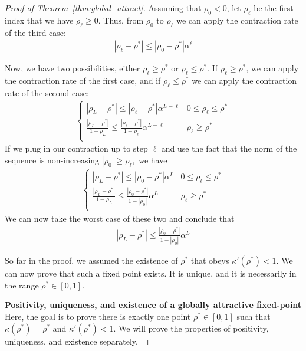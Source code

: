 \documentclass[twoside]{article}
\theoremstyle{definition}
\begin{document}
\begin{proof}[Proof of Theorem~\ref{thm:global_attract}]
Assuming that $\rho_0 < 0$, let $\rho_\ell$ be the first index that we have $\rho_\ell \ge 0$. Thus, from $\rho_0$ to $\rho_\ell$ we can apply the contraction rate of the third case:
\begin{align*}
|\rho_\ell - \rho^*| \le |\rho_0 - \rho^*| \alpha^\ell
\end{align*}

Now, we have two possibilities, either $\rho_\ell \ge \rho^*$ or $\rho_\ell \le \rho^*$. If $\rho_\ell \ge \rho^*$, we can apply the contraction rate of the first case, and if $\rho_\ell \le \rho^*$ we can apply the contraction rate of the second case:
\begin{align*}
    \begin{cases}
|\rho_L - \rho^*| \le |\rho_\ell - \rho^*| \alpha^{L-\ell} & 0\le \rho_\ell\le \rho^*\\
\frac{|\rho_L-\rho^*|}{1-\rho_L} \le \frac{|\rho_\ell-\rho^*|}{1-\rho_\ell}\alpha^{L-\ell} & \rho_\ell\ge \rho^* \\
    \end{cases}
\end{align*}
If we plug in our contraction up to step $\ell$ and use the fact that the norm of the sequence is non-increasing $|\rho_0|\ge \rho_\ell,$ we have
\begin{align*}
    \begin{cases}
|\rho_L - \rho^*| \le |\rho_0 - \rho^*| \alpha^{L} & 0\le \rho_\ell\le \rho^*\\
\frac{|\rho_L-\rho^*|}{1-\rho_L} \le \frac{|\rho_0-\rho^*|}{1-|\rho_0|}\alpha^{L} & \rho_\ell\ge \rho^* \\
    \end{cases}
\end{align*}
We can now take the worst case of these two and conclude that
\begin{align*}
|\rho_L - \rho^*| \le \frac{|\rho_0 - \rho^*|}{1-|\rho_0|} \alpha^L
\end{align*}

So far in the proof, we assumed the existence of $\rho^*$ that obeys $\kappa'(\rho^*)<1.$ We can now prove that such a fixed point exists. It is unique, and it is necessarily in the range $\rho^*\in [0,1].$

\textbf{Positivity, uniqueness, and existence of a globally attractive fixed-point}
Here, the goal is to prove there is exactly one point $\rho^*\in[0,1]$ such that $\kappa(\rho^*) = \rho^*$ and $\kappa'(\rho^*) < 1.$ We will prove the properties of positivity, uniqueness, and existence separately.


\end{proof}
\end{document}
